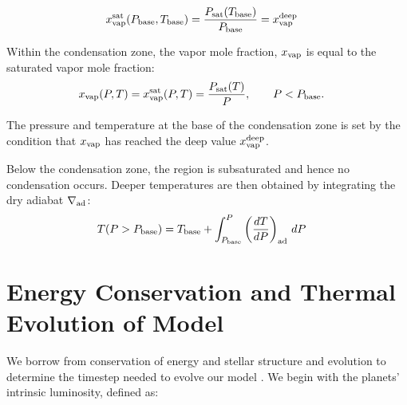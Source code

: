 \documentclass[11pt]{ucscthesisbs}
\begin{document}
\begin{align}
x_{\rm vap}^{\rm sat}(P_{\rm base}, T_{\rm base}) &= \frac{P_{\rm sat}(T_{\rm base})}{P_{\rm base}}=x_{\rm vap}^{\rm deep}
\end{align}

Within the condensation zone, the vapor mole fraction, $x_{\rm vap}$ is equal to the saturated vapor mole fraction:
\begin{align}
x_{\rm vap}(P, T) &= x_{\rm vap}^{\rm sat}(P, T) = \frac{P_{\rm sat}(T)}{P}, \qquad P<P_{\rm base}.
\label{eq:vapor_mole_fraction_within_condensation_zone}
\end{align}

The pressure and temperature at the base of the condensation zone is set by the condition that $x_{\rm vap}$ has reached the deep value $x_{\rm vap}^{\rm deep}$.

Below the condensation zone, the region is subsaturated and hence no condensation occurs. Deeper temperatures are then obtained by integrating the dry adiabat $\nabla_{\rm ad}$:
\begin{align}
T(P>P_{\rm base}) &= T_{\rm base} + \int_{P_{\rm base}}^P\left(\frac{dT}{dP}\right)_{\rm ad}\,d P
\label{eq:dry_adiabat_integration}
\end{align}



\section{Energy Conservation and Thermal Evolution of Model}
We borrow from conservation of energy and stellar structure and evolution to determine the timestep needed to evolve our model \citep{kippenhahn_2012}. We begin with the planets' intrinsic luminosity, defined as:
\end{document}
